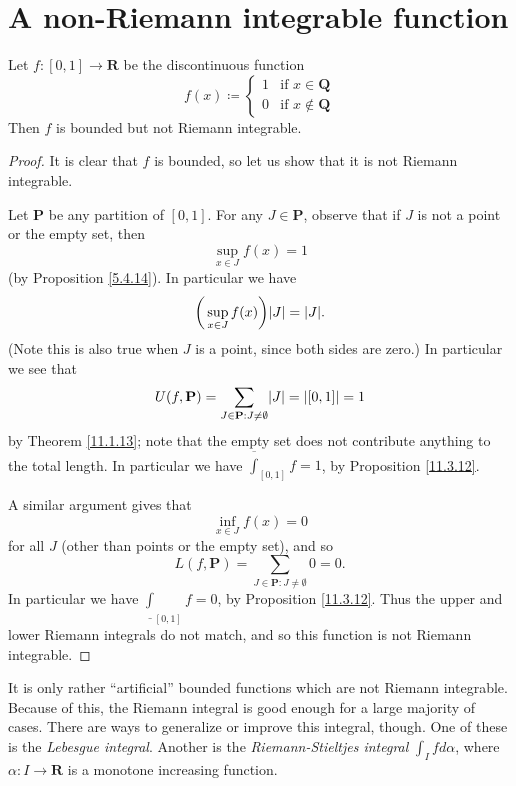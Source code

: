 \section{A non-Riemann integrable function}\label{sec 11.7}

\begin{proposition}\label{11.7.1}
    Let \(f : [0, 1] \to \mathbf{R}\) be the discontinuous function
    \[
        f(x) \coloneqq \begin{cases}
            1 & \text{if } x \in \mathbf{Q}    \\
            0 & \text{if } x \notin \mathbf{Q}
        \end{cases}
    \]
    Then \(f\) is bounded but not Riemann integrable.
\end{proposition}

\begin{proof}
    It is clear that \(f\) is bounded, so let us show that it is not Riemann integrable.

    Let \(\mathbf{P}\) be any partition of \([0, 1]\).
    For any \(J \in \mathbf{P}\), observe that if \(J\) is not a point or the empty set, then
    \[
        \sup_{x \in J} f(x) = 1
    \]
    (by Proposition \ref{5.4.14}).
    In particular we have
    \[
        \bigg(\sup_{x \in J} f(x)\bigg) \abs*{J} = \abs*{J}.
    \]
    (Note this is also true when \(J\) is a point, since both sides are zero.)
    In particular we see that
    \[
        U(f, \mathbf{P}) = \sum_{J \in \mathbf{P} : J \neq \emptyset} \abs*{J} = \abs*{[0, 1]} = 1
    \]
    by Theorem \ref{11.1.13};
    note that the empty set does not contribute anything to the total length.
    In particular we have \(\overline{\int}_{[0, 1]} f = 1\), by Proposition \ref{11.3.12}.

    A similar argument gives that
    \[
        \inf_{x \in J} f(x) = 0
    \]
    for all \(J\) (other than points or the empty set), and so
    \[
        L(f, \mathbf{P}) = \sum_{J \in \mathbf{P} : J \neq \emptyset} 0 = 0.
    \]
    In particular we have \(\underline{\int}_{[0, 1]} f = 0\), by Proposition \ref{11.3.12}.
    Thus the upper and lower Riemann integrals do not match, and so this function is not Riemann integrable.
\end{proof}

\begin{remark}\label{11.7.2}
    It is only rather ``artificial'' bounded functions which are not Riemann integrable.
    Because of this, the Riemann integral is good enough for a large majority of cases.
    There are ways to generalize or improve this integral, though.
    One of these is the \emph{Lebesgue integral}.
    Another is the \emph{Riemann-Stieltjes integral} \(\int_I f d\alpha\), where \(\alpha : I \to \mathbf{R}\) is a monotone increasing function.
\end{remark}